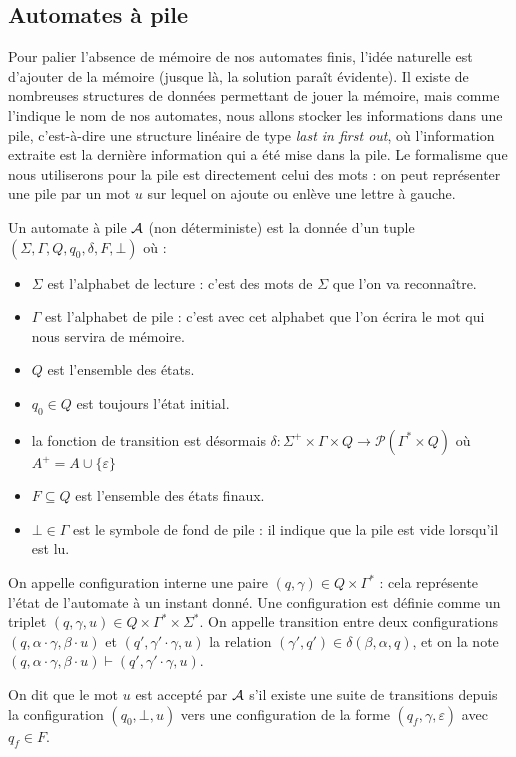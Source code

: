 \subsection{Automates à pile}

Pour palier l'absence de mémoire de nos automates finis, l'idée naturelle est d'ajouter de la mémoire (jusque là, la solution paraît évidente). Il existe de nombreuses structures de données permettant de jouer la mémoire, mais comme l'indique le nom de nos automates, nous allons stocker les informations dans une pile, c'est-à-dire une structure linéaire de type \textit{last in first out}, où l'information extraite est la dernière information qui a été mise dans la pile. Le formalisme que nous utiliserons pour la pile est directement celui des mots : on peut représenter une pile par un mot $u$ sur lequel on ajoute ou enlève une lettre à gauche.

\begin{defi}
    Un automate à pile $\mathcal A$ (non déterministe) est la donnée d'un tuple $(\Sigma,\Gamma,Q,q_0,\delta,F,\bot)$ où :
    \begin{itemize}[label=$\bullet$]
        \item $\Sigma$ est l'alphabet de lecture : c'est des mots de $\Sigma$ que l'on va reconnaître.
        \item $\Gamma$ est l'alphabet de pile : c'est avec cet alphabet que l'on écrira le mot qui nous servira de mémoire.
        \item $Q$ est l'ensemble des états.
        \item $q_0\in Q$ est toujours l'état initial.
        \item la fonction de transition est désormais $\delta : \Sigma^+\times \Gamma\times Q \to \mathcal P(\Gamma^*\times Q)$ où $A^+ = A \cup \{\varepsilon\}$
        \item $F\subseteq Q$ est l'ensemble des états finaux.
        \item $\bot\in \Gamma$ est le symbole de fond de pile : il indique que la pile est vide lorsqu'il est lu.
    \end{itemize}

    On appelle configuration interne une paire $(q,\gamma)\in Q \times \Gamma^*$ : cela représente l'état de l'automate à un instant donné. Une configuration est définie comme un triplet $(q,\gamma,u)\in Q\times \Gamma^*\times \Sigma^*$. On appelle transition entre deux configurations $(q,\alpha\cdot\gamma,\beta\cdot u)$ et $(q',\gamma'\cdot\gamma,u)$ la relation $(\gamma',q')\in\delta(\beta,\alpha,q)$, et on la note $(q,\alpha\cdot\gamma,\beta\cdot u) \vdash (q',\gamma'\cdot\gamma,u)$.

    On dit que le mot $u$ est accepté par $\mathcal A$ s'il existe une suite de transitions depuis la configuration $(q_0,\bot,u)$ vers une configuration de la forme $(q_f,\gamma,\varepsilon)$ avec $q_f\in F$.
\end{defi}

